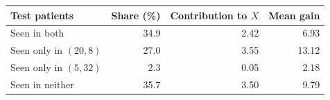 \begin{tabular}{@{}lrrr@{}}
\toprule
Test patients & Share (\%) & Contribution to $X$ & Mean gain \\
\midrule
Seen in both & 34.9 & 2.42 & 6.93 \\
Seen only in $(20, 8)$ & 27.0 & 3.55 & 13.12 \\
Seen only in $(5, 32)$ & 2.3 & 0.05 & 2.18 \\
Seen in neither & 35.7 & 3.50 & 9.79 \\
\bottomrule
\end{tabular}
